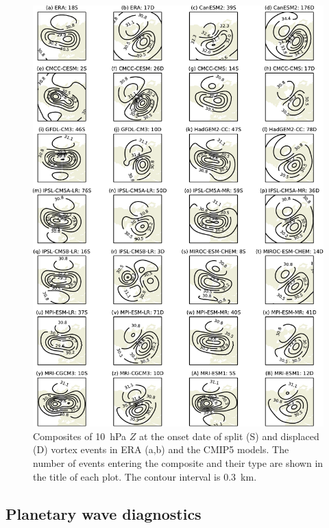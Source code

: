 \begin{figure}
 \centering
 \noindent\includegraphics[width=\textwidth]{figures/chapter-models/10hPa_GPH_composites.pdf}
 \caption[Composites of 10~hPa $Z$ at the onset date split and displaced vortex
 events in the CMIP5 models.]{Composites of 10~hPa $Z$ at the onset date of
   split (S) and displaced (D) vortex events in ERA (a,b) and the CMIP5
   models. The number of events entering the composite and their type are
   shown in the title of each plot. The contour interval is 0.3~km.}
 \label{fig:10hPa_GPH_comp}
\end{figure}

\subsection{Planetary wave diagnostics}

